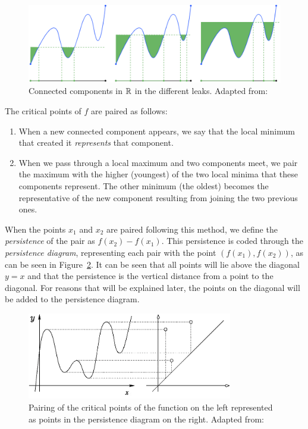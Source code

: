\documentclass[../main.tex]{subfiles}
\begin{document}
\begin{figure}[!ht]
    \centering
    \includegraphics[width=\textwidth]{figures/bg/1dpers.png}
    \caption{Connected components in $\mathbb{R}$ in the different leaks. Adapted from: \cite{curry_counting_2020}}
    \label{fig:sublevelR}
\end{figure}

The critical points of $f$ are paired as follows:
\begin{enumerate}
    \item When a new connected component appears, we say that the local minimum that created it \emph{represents} that component.
    \item When we pass through a local maximum and two components meet, we pair the maximum with the higher (youngest) of the two local minima that these components represent. The other minimum (the oldest) becomes the representative of the new component resulting from joining the two previous ones.
\end{enumerate}

When the points $x_1$ and $x_2$ are paired following this method, we define the \emph{persistence} of the pair as $f(x_2) - f(x_1)$. This persistence is coded through the \emph{persistence diagram}, representing each pair with the point $(f(x_1),f(x_2))$, as can be seen in Figure~\ref{fig:persistenceR}. It can be seen that all points will lie above the diagonal $y=x$ and that the persistence is the vertical distance from a point to the diagonal. For reasons that will be explained later, the points on the diagonal will be added to the persistence diagram.

\begin{figure}[!ht]
\centering
\includegraphics[width=0.8\textwidth]{figures/bg/diagramaR.png} 
\caption{Pairing of the critical points of the function on the left represented as points in the persistence diagram on the right. Adapted from: \cite{goodman_persistent_2008}}
\label{fig:persistenceR}
\end{figure}
\end{document}
